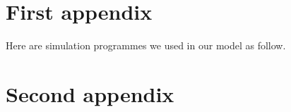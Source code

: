 \documentclass{mcmthesis}
\begin{document}
\begin{appendices}

\section{First appendix}

\indent \indent Here are simulation programmes we used in our model as follow.\\

% 

\section{Second appendix}

% 

\end{appendices}
\end{document}
